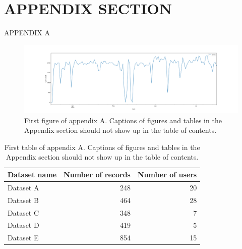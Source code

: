 \chapter*{APPENDIX SECTION}
\label{ch:appendix}

\renewcommand{\thetable}{A.\arabic{table}}  
\renewcommand{\thefigure}{A.\arabic{figure}}
\setcounter{figure}{0}
\setcounter{table}{0}

\begin{center}
APPENDIX A
\end{center}

\begin{figure}[ht]
\centering
\includegraphics[scale=0.6]{Figs/Fig2.png}
\caption{First figure of appendix A. Captions of figures and tables in the Appendix section should not show up in the table of contents.}
\label{fig:figure1AP}
\end{figure}

\begin{table}[ht]
\caption{First table of appendix A. Captions of figures and tables in the Appendix section should not show up in the table of contents.}
\centering
\fontsize{10}{12}\selectfont
\begin{tabular}{|l|r|r|}
\hline
Dataset name & Number of records  & Number of users \\
\hline 
Dataset A & 248 & 20 \\
\hline
Dataset B & 464 & 28 \\
\hline
Dataset C & 348 & 7 \\
\hline
Dataset D & 419 & 5\\
\hline
Dataset E & 854 & 15\\
\hline
\end{tabular}
\label{tab:table1AP}
\end{table}


